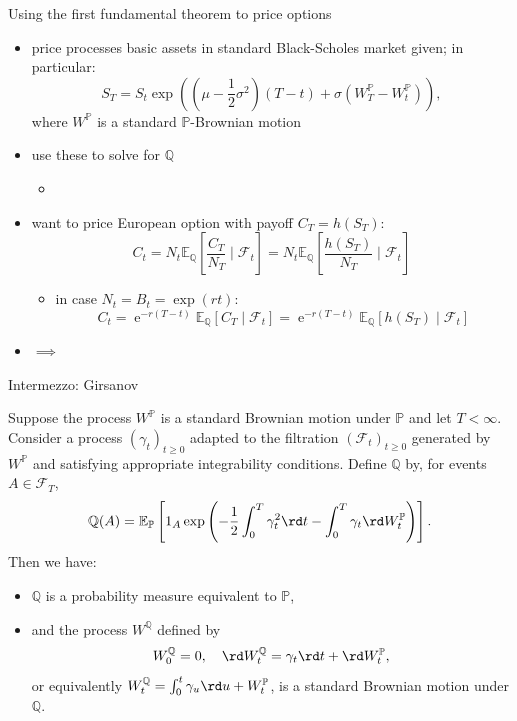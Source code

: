 \documentclass[pdf, handout]{beamer}
\newcommand{\e}{\operatorname{e}}
\begin{document}
\begin{frame}{Using the first fundamental theorem to price options}
\begin{itemize}
\item price processes basic assets in standard Black-Scholes market given; in particular:
\[
S_T = S_t \exp\left(  (\mu - \frac{1}{2}\sigma^2)(T-t) + \sigma (W_T^{\mathbb{P}} - W_t^{\mathbb{P}})   \right),
\]
where $W^{\mathbb{P}}$ is a standard $\mathbb{P}$-Brownian motion
\item use these to solve for $\mathbb{Q}$
\begin{itemize}
\item \textbf{\color{red}{how?}  }
\end{itemize}
\item want to price European option with payoff $C_T=h(S_T)$:
\[
C_t=N_t \mathbb{E}_{\mathbb{Q}}\left[ \frac{C_T}{N_T} \mid \mathcal{F}_t  \right]
=N_t \mathbb{E}_{\mathbb{Q}}\left[ \frac{h(S_T)}{N_T} \mid \mathcal{F}_t  \right]
\]
\begin{itemize}
\item in case $N_t=B_t=\exp(rt)$:
\[
C_t=\e^{-r(T-t)} \mathbb{E}_{\mathbb{Q}}\left[  C_T \mid \mathcal{F}_t  \right]
=\e^{-r(T-t)} \mathbb{E}_{\mathbb{Q}}\left[  h(S_T) \mid \mathcal{F}_t  \right]
\]
\end{itemize}
\item $\implies$
\textbf{}
\end{itemize}

\end{frame}
%
\begin{frame}{Intermezzo: Girsanov}
\begin{theorem}[Girsanov]
\small{
Suppose the process $W^{\mathbb{P}}$ is a standard Brownian motion under $\mathbb{P}$ and  let $T<\infty$.
Consider a process $(\gamma_t)_{t\geq 0}$  adapted to the filtration $(\mathcal{F}_t)_{t\geq 0}$  generated by $W^{\mathbb{P}}$ and
satisfying appropriate integrability conditions.
Define
$\mathbb{Q}$ by, for events $A \in\mathcal{F}_T$,
\[
\mathbb{Q}(A)=%
\mathbb{E}_{\mathbb{P}}\left[ 1_A \exp\left(  -\frac{1}{2} \int_0^T \gamma_t^2 \rd t   - \int_0^T \gamma_t  \rd W^{\mathbb{P}}_t         \right)\right].
\]
Then we have:
\begin{itemize}
\item
$\mathbb{Q}$ is a probability measure equivalent to $\mathbb{P}$,
\item and the process $W^{\mathbb{Q}}$ defined by
\[
W^{\mathbb{Q}}_0=0,\quad
\rd W^{\mathbb{Q}}_t=\gamma_t \rd t + \rd W^{\mathbb{P}}_t 
,
\]
or equivalently $
W^{\mathbb{Q}}_t=\int_0^t \gamma_u \rd u +  W^{\mathbb{P}}_t$,
is a standard Brownian motion under $\mathbb{Q}$.
\end{itemize}
}
\end{theorem}
\end{frame}
\end{document}
